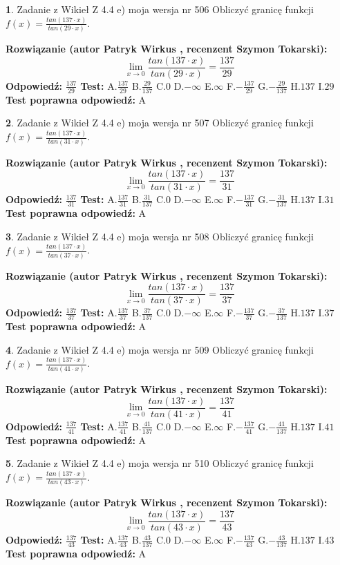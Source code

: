 \documentclass[12pt, a4paper]{article}
\theoremstyle{definition} %
\newtheorem{zad}{}
\newcommand{\zadStart}[1]{\begin{zad}#1\newline}
\newcommand{\zadStop}{\end{zad}}
\newcommand{\rozwStart}[2]{\noindent \textbf{Rozwiązanie (autor #1 , recenzent #2): }\newline}
\newcommand{\rozwStop}{\newline}
\newcommand{\odpStart}{\noindent \textbf{Odpowiedź:}\newline}
\newcommand{\odpStop}{\newline}
\newcommand{\testStart}{\noindent \textbf{Test:}\newline}
\newcommand{\testStop}{\newline}
\newcommand{\kluczStart}{\noindent \textbf{Test poprawna odpowiedź:}\newline}
\newcommand{\kluczStop}{\newline}
\begin{document}
\zadStart{Zadanie z Wikieł Z 4.4 e) moja wersja nr 506}
Obliczyć granicę funkcji $f(x)=\frac{tan(137\cdot x)}{tan(29\cdot x)}$.
\zadStop
\rozwStart{Patryk Wirkus}{Szymon Tokarski}
$$\lim\limits_{x\to 0}\frac{tan(137\cdot x)}{tan(29\cdot x)}=
\frac{137}{29}$$
\rozwStop
\odpStart
$\frac{137}{29}$
\odpStop
\testStart
A.$\frac{137}{29}$
B.$\frac{29}{137}$
C.$0$
D.$-\infty$
E.$\infty$
F.$-\frac{137}{29}$
G.$-\frac{29}{137}$
H.$137$
I.$29$
\testStop
\kluczStart
A
\kluczStop



\zadStart{Zadanie z Wikieł Z 4.4 e) moja wersja nr 507}
Obliczyć granicę funkcji $f(x)=\frac{tan(137\cdot x)}{tan(31\cdot x)}$.
\zadStop
\rozwStart{Patryk Wirkus}{Szymon Tokarski}
$$\lim\limits_{x\to 0}\frac{tan(137\cdot x)}{tan(31\cdot x)}=
\frac{137}{31}$$
\rozwStop
\odpStart
$\frac{137}{31}$
\odpStop
\testStart
A.$\frac{137}{31}$
B.$\frac{31}{137}$
C.$0$
D.$-\infty$
E.$\infty$
F.$-\frac{137}{31}$
G.$-\frac{31}{137}$
H.$137$
I.$31$
\testStop
\kluczStart
A
\kluczStop



\zadStart{Zadanie z Wikieł Z 4.4 e) moja wersja nr 508}
Obliczyć granicę funkcji $f(x)=\frac{tan(137\cdot x)}{tan(37\cdot x)}$.
\zadStop
\rozwStart{Patryk Wirkus}{Szymon Tokarski}
$$\lim\limits_{x\to 0}\frac{tan(137\cdot x)}{tan(37\cdot x)}=
\frac{137}{37}$$
\rozwStop
\odpStart
$\frac{137}{37}$
\odpStop
\testStart
A.$\frac{137}{37}$
B.$\frac{37}{137}$
C.$0$
D.$-\infty$
E.$\infty$
F.$-\frac{137}{37}$
G.$-\frac{37}{137}$
H.$137$
I.$37$
\testStop
\kluczStart
A
\kluczStop



\zadStart{Zadanie z Wikieł Z 4.4 e) moja wersja nr 509}
Obliczyć granicę funkcji $f(x)=\frac{tan(137\cdot x)}{tan(41\cdot x)}$.
\zadStop
\rozwStart{Patryk Wirkus}{Szymon Tokarski}
$$\lim\limits_{x\to 0}\frac{tan(137\cdot x)}{tan(41\cdot x)}=
\frac{137}{41}$$
\rozwStop
\odpStart
$\frac{137}{41}$
\odpStop
\testStart
A.$\frac{137}{41}$
B.$\frac{41}{137}$
C.$0$
D.$-\infty$
E.$\infty$
F.$-\frac{137}{41}$
G.$-\frac{41}{137}$
H.$137$
I.$41$
\testStop
\kluczStart
A
\kluczStop



\zadStart{Zadanie z Wikieł Z 4.4 e) moja wersja nr 510}
Obliczyć granicę funkcji $f(x)=\frac{tan(137\cdot x)}{tan(43\cdot x)}$.
\zadStop
\rozwStart{Patryk Wirkus}{Szymon Tokarski}
$$\lim\limits_{x\to 0}\frac{tan(137\cdot x)}{tan(43\cdot x)}=
\frac{137}{43}$$
\rozwStop
\odpStart
$\frac{137}{43}$
\odpStop
\testStart
A.$\frac{137}{43}$
B.$\frac{43}{137}$
C.$0$
D.$-\infty$
E.$\infty$
F.$-\frac{137}{43}$
G.$-\frac{43}{137}$
H.$137$
I.$43$
\testStop
\kluczStart
A
\kluczStop
\end{document}

